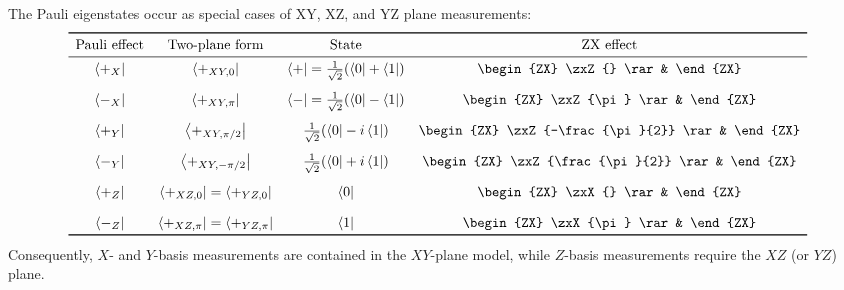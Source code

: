 \begin{lemma}
\label{lemma:pauli-states-three-plane}
The Pauli eigenstates occur as special cases of XY, XZ, and YZ plane measurements:
\[
\begin{array}{c c c c}
    \toprule
    \text{Pauli effect} & \text{Two-plane form} & \text{State} & \text{ZX effect} \\
    \midrule
    \bra{+_X}
    &
    \bra{+_{XY,0}}
    &
    \bra+ = \frac{1}{\sqrt2}(\bra0+\bra1)
    &
    \begin{ZX}
        \zxZ{} \rar &
    \end{ZX}
    \\[1em]

    \bra{-_X}
    &
    \bra{+_{XY,\pi}}
    &
    \bra- = \frac{1}{\sqrt2}(\bra0-\bra1)
    &
    \begin{ZX}
        \zxZ{\pi} \rar &
    \end{ZX}
    \\[1em]

    \bra{+_Y}
    &
    \bra{+_{XY,\pi/2}}
    &
    \frac{1}{\sqrt2}(\bra0-i\bra1)
    &
    \begin{ZX}
        \zxZ{-\frac{\pi}{2}} \rar &
    \end{ZX}
    \\[1em]

    \bra{-_Y}
    &
    \bra{+_{XY,-\pi/2}}
    &
    \frac{1}{\sqrt2}(\bra0+i\bra1)
    &
    \begin{ZX}
        \zxZ{\frac{\pi}{2}} \rar &
    \end{ZX}
    \\[1em]

    \bra{+_Z}
    &
    \bra{+_{XZ,0}}=\bra{+_{YZ,0}}
    &
    \bra0
    &
    \begin{ZX}
        \zxX{} \rar &
    \end{ZX}
    \\[1em]

    \bra{-_Z}
    &
    \bra{+_{XZ,\pi}}=\bra{+_{YZ,\pi}}
    &
    \bra1
    &
    \begin{ZX}
        \zxX{\pi} \rar &
    \end{ZX}
    \\
    \bottomrule
\end{array}
\]
Consequently, $X$- and $Y$-basis measurements are contained in the $XY$-plane model, while $Z$-basis measurements require the $XZ$ (or $YZ$) plane.
\end{lemma}

